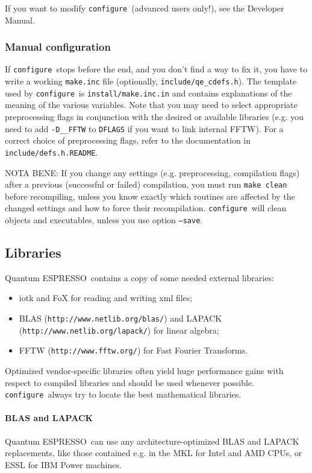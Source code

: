 \documentclass[12pt,a4paper]{article}
\def\qe{{\sc Quantum ESPRESSO}}
\def\configure{\texttt{configure}}
\begin{document}
If you want to modify \configure\ (advanced users only!),
see the Developer Manual.

\subsubsection{Manual configuration}
\label{SubSec:manconf}
If \configure\ stops before the end, and you don't find a way to fix
it, you have to write a working \texttt{make.inc} file (optionally,
\texttt{include/qe\_cdefs.h}). The template used by \configure\ is
\texttt{install/make.inc.in} and contains explanations of the meaning
of the various variables. Note that you may need
to select appropriate preprocessing flags
in conjunction with the desired or available
libraries (e.g. you need to add \texttt{-D\_\_FFTW} to \texttt{DFLAGS}
if you want to link internal FFTW). For a correct choice of preprocessing
flags, refer to the documentation in \texttt{include/defs.h.README}.

NOTA BENE: If you change any settings (e.g. preprocessing,
compilation flags)
after a previous (successful or failed) compilation, you must run
\texttt{make clean} before recompiling, unless you know exactly which
routines are affected by the changed settings and how to force their
recompilation. \configure\ will clean objects and executables, unless
you use option \texttt{--save}.

\subsection{Libraries}
\label{Sec:Libraries}

\qe\ contains a copy of some needed external libraries:
\begin{itemize}
 \item iotk and FoX for reading and writing xml files;
 \item BLAS (\texttt{http://www.netlib.org/blas/}) and LAPACK
  (\texttt{http://www.netlib.org/lapack/}) for linear algebra;
\item FFTW (\texttt{http://www.fftw.org/}) for Fast Fourier Transforms.
\end{itemize}
Optimized vendor-specific libraries often yield huge performance gains
with respect to compiled libraries and should be used whenever
possible. \configure\ always try to locate the best mathematical
libraries.
\\

\paragraph{BLAS and LAPACK}
\qe\ can use any architecture-optimized BLAS and LAPACK replacements,
like those contained e.g. in the MKL for Intel and AMD CPUs, or
ESSL for IBM Power machines.
\end{document}
